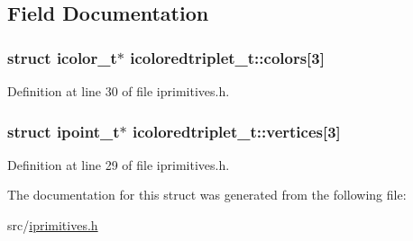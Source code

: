 \subsection{Field Documentation}
\hypertarget{structicoloredtriplet__t_ac0ba48c5e0ba663bd8c0fb7b3ac2a2a9}{
\subsubsection[{colors}]{\setlength{\rightskip}{0pt plus 5cm}struct {\bf icolor\-\_\-t}$\ast$ icoloredtriplet\-\_\-t\-::colors\mbox{[}3\mbox{]}}}\label{structicoloredtriplet__t_ac0ba48c5e0ba663bd8c0fb7b3ac2a2a9}


Definition at line 30 of file iprimitives.\-h.

\hypertarget{structicoloredtriplet__t_aa599939c78c387bc80a763f3e3728fee}{
\subsubsection[{vertices}]{\setlength{\rightskip}{0pt plus 5cm}struct {\bf ipoint\-\_\-t}$\ast$ icoloredtriplet\-\_\-t\-::vertices\mbox{[}3\mbox{]}}}\label{structicoloredtriplet__t_aa599939c78c387bc80a763f3e3728fee}


Definition at line 29 of file iprimitives.\-h.



The documentation for this struct was generated from the following file\-:\begin{DoxyCompactItemize}
\item 
src/\hyperlink{iprimitives_8h}{iprimitives.\-h}\end{DoxyCompactItemize}
